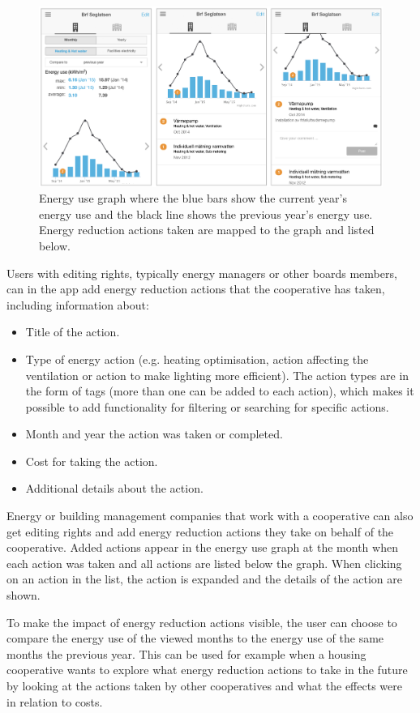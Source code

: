 \begin{figure}
	\centering
	\includegraphics[width=0.98\linewidth]{img/Figure201_Actions.png}
	\caption{Energy use graph where the blue bars show the current year's energy use and the black line shows the previous year's energy use. Energy reduction actions taken are mapped to the graph and listed below.}
	\label{fig:Figure201_Actions}
\end{figure}

Users with editing rights, typically energy managers or other boards members, can in the app add energy reduction actions that the cooperative has taken, including information about:
\begin{itemize}
\item Title of the action.
\item Type of energy action (e.g. heating optimisation, action affecting the ventilation or action to make lighting more efficient). The action types are in the form of tags (more than one can be added to each action), which makes it possible to add functionality for filtering or searching for specific actions.
\item Month and year the action was taken or completed.
\item Cost for taking the action.
\item Additional details about the action.
\end{itemize}

Energy or building management companies that work with a cooperative can also get editing rights and add energy reduction actions they take on behalf of the cooperative. Added actions appear in the energy use graph at the month when each action was taken and all actions are listed below the graph. When clicking on an action in the list, the action is expanded and the details of the action are shown.

To make the impact of energy reduction actions visible, the user can choose to compare the energy use of the viewed months to the energy use of the same months the previous year. This can be used for example when a housing cooperative wants to explore what energy reduction actions to take in the future by looking at the actions taken by other cooperatives and what the effects were in relation to costs.

